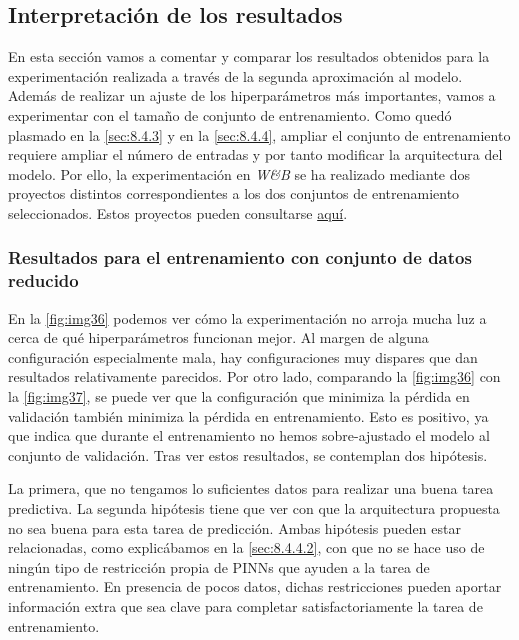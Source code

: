 \subsection{Interpretación de los resultados}

En esta sección vamos a comentar y comparar los resultados obtenidos para la experimentación realizada a través de la segunda aproximación al modelo. Además de realizar un ajuste de los hiperparámetros más importantes, vamos a experimentar con el tamaño de conjunto de entrenamiento. Como quedó plasmado en la \autoref{sec:8.4.3} y en la \autoref{sec:8.4.4}, ampliar el conjunto de entrenamiento requiere ampliar el número de entradas y por tanto modificar la arquitectura del modelo. Por ello, la experimentación en \textit{W\&B} se ha realizado mediante dos proyectos distintos correspondientes a los dos conjuntos de entrenamiento seleccionados. Estos proyectos pueden consultarse \hyperlink{https://wandb.ai/vaatiper-Universidad\%20de\%20Granada/projects}{aquí}.

\subsubsection{Resultados para el entrenamiento con conjunto de datos reducido}

En la \autoref{fig:img36} podemos ver cómo la experimentación no arroja mucha luz a cerca de qué hiperparámetros funcionan mejor. Al margen de alguna configuración especialmente mala, hay configuraciones muy dispares que dan resultados relativamente parecidos. Por otro lado, comparando la \autoref{fig:img36} con la \autoref{fig:img37}, se puede ver que la configuración que minimiza la pérdida en validación también minimiza la pérdida en entrenamiento. Esto es positivo, ya que indica que durante el entrenamiento no hemos sobre-ajustado el modelo al conjunto de validación. Tras ver estos resultados, se contemplan dos hipótesis. 

La primera, que no tengamos lo suficientes datos para realizar una buena tarea predictiva. La segunda hipótesis tiene que ver con que la arquitectura propuesta no sea buena para esta tarea de predicción. Ambas hipótesis pueden estar relacionadas, como explicábamos en la \autoref{sec:8.4.4.2}, con que no se hace uso de ningún tipo de restricción propia de PINNs que ayuden a la tarea de entrenamiento.  En presencia de pocos datos, dichas restricciones pueden aportar información extra que sea clave para completar satisfactoriamente la tarea de entrenamiento. 

